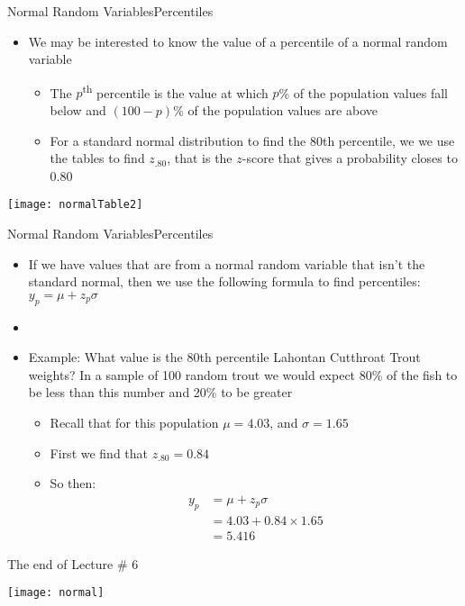 \documentclass[xcolor=dvipsnames]{beamer}
\begin{document}
\begin{frame}{Normal Random Variables}{Percentiles}
	\begin{itemize}
		\item We may be interested to know the value of a percentile of a normal random variable \pause
		\begin{itemize}
			\item The $p$\textsuperscript{th} percentile is the value at which $p$\% of the population values fall below and $(100-p)$\% of the population values are above \pause
			\item For a standard normal distribution to find the 80th percentile, we we use the tables to find $z_{.80}$, that is the $z$-score that gives a probability closes to 0.80 \pause
		\end{itemize}
	\end{itemize}
	\begin{center}
		\texttt{[image: normalTable2]}
	\end{center}
\end{frame}

\begin{frame}{Normal Random Variables}{Percentiles}
	\begin{itemize}
		\item If we have values that are from a normal random variable that isn't the standard normal, then we use the following formula to find percentiles: $y_p = \mu + z_p \sigma$ \pause
		\item[]
		\item Example: What value is the 80th percentile Lahontan Cutthroat Trout weights? In a sample of 100 random trout we would expect 80\% of the fish to be less than this number and 20\% to be greater \pause
		\begin{itemize}
			\item Recall that for this population $\mu = 4.03$, and $\sigma = 1.65$ \pause
			\item First we find that $z_{.80} = 0.84$ \pause
			\item So then: \pause
			\begin{align*}
				y_p &= \mu + z_p \sigma \\
				&= 4.03 + 0.84 \times 1.65 \\
				&= 5.416
			\end{align*}
		\end{itemize}
	\end{itemize}
\end{frame}

\begin{frame}{The end of Lecture \# 6}
	\begin{center}
		\texttt{[image: normal]}
	\end{center}
\end{frame}
\end{document}
